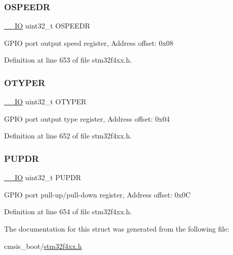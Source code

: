 \subsubsection{\texorpdfstring{O\+S\+P\+E\+E\+DR}{OSPEEDR}}
{\footnotesize\ttfamily \hyperlink{group___c_m_s_i_s__core__definitions_gaec43007d9998a0a0e01faede4133d6be}{\+\_\+\+\_\+\+IO} uint32\+\_\+t O\+S\+P\+E\+E\+DR}

G\+P\+IO port output speed register, Address offset\+: 0x08 

Definition at line 653 of file stm32f4xx.\+h.

\mbox{\label{struct_g_p_i_o___type_def_a9543592bda60cb5261075594bdeedac9}} 
\subsubsection{\texorpdfstring{O\+T\+Y\+P\+ER}{OTYPER}}
{\footnotesize\ttfamily \hyperlink{group___c_m_s_i_s__core__definitions_gaec43007d9998a0a0e01faede4133d6be}{\+\_\+\+\_\+\+IO} uint32\+\_\+t O\+T\+Y\+P\+ER}

G\+P\+IO port output type register, Address offset\+: 0x04 

Definition at line 652 of file stm32f4xx.\+h.

\mbox{\label{struct_g_p_i_o___type_def_abeed38529bd7b8de082e490e5d4f1727}} 
\subsubsection{\texorpdfstring{P\+U\+P\+DR}{PUPDR}}
{\footnotesize\ttfamily \hyperlink{group___c_m_s_i_s__core__definitions_gaec43007d9998a0a0e01faede4133d6be}{\+\_\+\+\_\+\+IO} uint32\+\_\+t P\+U\+P\+DR}

G\+P\+IO port pull-\/up/pull-\/down register, Address offset\+: 0x0C 

Definition at line 654 of file stm32f4xx.\+h.



The documentation for this struct was generated from the following file\+:\begin{DoxyCompactItemize}
\item 
cmsis\+\_\+boot/\hyperlink{stm32f4xx_8h}{stm32f4xx.\+h}\end{DoxyCompactItemize}

